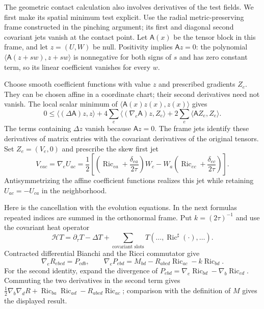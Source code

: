 The geometric contact calculation also involves derivatives of the
test fields.  We first make its spatial minimum test explicit.
Use the radial metric-preserving frame constructed in the pinching
argument; its first and diagonal second covariant jets vanish at the
contact point.  Let $\mathsf A(x)$ be the tensor block in this frame,
and let $z=(U,W)$ be null.  Positivity implies $\mathsf A z=0$:
the polynomial $\langle\mathsf A(z+sw),z+sw\rangle$ is nonnegative
for both signs of $s$ and has zero constant term, so its linear
coefficient vanishes for every $w$.

Choose smooth coefficient functions with value $z$ and prescribed
gradients $Z_e$.  They can be chosen affine in a coordinate chart;
their second derivatives need not vanish.  The local scalar minimum of
$\langle\mathsf A(x)z(x),z(x)\rangle$ gives
\[
 0\leq\langle(\Delta\mathsf A)z,z\rangle
       +4\sum_e\langle(\nabla_e\mathsf A)z,Z_e\rangle
       +2\sum_e\langle\mathsf A Z_e,Z_e\rangle.
\]
The terms containing $\Delta z$ vanish because $\mathsf A z=0$.
The frame jets identify these derivatives of matrix entries with
the covariant derivatives of the original tensors.
Set $Z_e=(V_e,0)$ and prescribe the skew first jet
\[
 V_{eac}=\nabla_eU_{ac}=\frac12\left[
 \left(\operatorname{Ric}_{ea}+\frac{\delta_{ea}}{2\tau}\right)W_c
 -W_a\left(\operatorname{Ric}_{ec}+\frac{\delta_{ec}}{2\tau}\right)\right].
\]
Antisymmetrizing the affine coefficient functions realizes this jet
while retaining $U_{ac}=-U_{ca}$ in the neighborhood.

Here is the cancellation with the evolution equations.  In the next
formulas repeated indices are summed in the orthonormal frame.  Put
$k=(2\tau)^{-1}$ and use the covariant heat operator
\[
 \mathcal HT=\partial_\tau T-\Delta T+
       \sum_{\text{covariant slots}}T(\ldots,
                         \operatorname{Ric}^{\sharp}(\cdot),\ldots).
\]
Contracted differential Bianchi and the Ricci commutator give
\[
 \nabla_eR_{ebcd}=P_{cdb},\qquad
 \nabla_eP_{ebd}=M_{bd}-R_{abcd}\operatorname{Ric}_{ac}
                             -k\operatorname{Ric}_{bd}.
\]
For the second identity, expand the divergence of
$P_{ebd}=\nabla_e\operatorname{Ric}_{bd}-\nabla_b\operatorname{Ric}_{ed}$.
Commuting the two derivatives in the second term gives
$\tfrac12\nabla_b\nabla_d R+\operatorname{Ric}_{ba}\operatorname{Ric}_{ad}
-R_{abcd}\operatorname{Ric}_{ac}$; comparison with the definition of
$M$ gives the displayed result.

